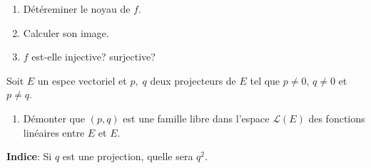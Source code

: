\documentclass[10pt, a4paper, twocolumn]{homework}
\begin{document}
\begin{enumerate}
  \item Détéreminer le noyau de $f$.
  \item Calculer son image.
  \item $f$ est-elle injective? surjective?
\end{enumerate}

Soit $E$ un espce vectoriel et $p,\;q$ deux projecteurs de $E$ tel que $p\neq
0$, $q\neq 0$ et $p\neq q$.

\begin{enumerate}
  \item Démonter que $(p,q)$ est une famille libre dans l'espace
    $\mathcal{L}(E)$ des fonctions linéaires entre $E$ et $E$.
\end{enumerate}

\textbf{Indice}: Si $q$ est une projection, quelle sera $q^2$.
\end{document}
